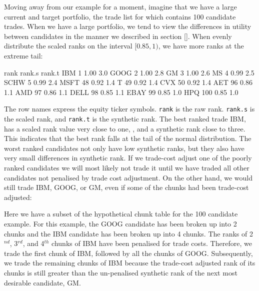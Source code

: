 \documentclass{article}
\begin{document}
Moving away from our example for a moment, imagine that we have a
large current and target portfolio, the trade list for which contains
100 candidate trades.  When we have a large portfolio, we tend to
view the differences in  utility between candidates in the
manner we described in section \ref{}.  When evenly distribute the
scaled ranks on the interval $[0.85,1)$, we have more ranks at
the extreme tail:

\begin{Schunk}
\begin{Soutput}
     rank rank.s rank.t
IBM     1   1.00    3.0
GOOG    2   1.00    2.8
GM      3   1.00    2.6
MS      4   0.99    2.5
SCHW    5   0.99    2.4
MSFT   48   0.92    1.4
T      49   0.92    1.4
CVX    50   0.92    1.4
AET    96   0.86    1.1
AMD    97   0.86    1.1
DELL   98   0.85    1.1
EBAY   99   0.85    1.0
HPQ   100   0.85    1.0
\end{Soutput}
\end{Schunk}

The row names express the equity ticker symbols.  \texttt{rank} is the
raw rank. \texttt{rank.s} is the scaled rank, and \texttt{rank.t} is
the synthetic rank.  The best ranked trade
IBM, has a scaled rank value very
close to one, , and
a synthetic rank close to three.  This indicates that the best rank
falls at the tail of the normal distribution.  The worst ranked
candidates not only have low synthetic ranks, but they also have very
small  differences in synthetic rank.  If we trade-cost adjust
one of the poorly ranked candidates we will most likely not trade it
until we have traded all other candidates not penalised by trade cost
adjustment.  On the other hand, we would still trade
IBM,
GOOG, or
GM, even if some of the chunks had
been trade-cost adjusted:

Here we have a subset of the hypothetical chunk table for the 100
candidate example.  For this example, the GOOG candidate has been
broken up into 2 chunks and the IBM candidate has been broken up into
4 chunks.  The ranks of 2$^{nd}$, 3$^{rd}$, and
4$^{th}$ chunks of IBM have been penalised for trade costs.
Therefore, we trade the first chunk of IBM, followed by all the chunks
of GOOG.  Subsequently, we trade the remaining chunks of IBM because
the trade-cost adjusted rank of its chunks is still greater than the
un-penalised synthetic rank of the next most desirable candidate, GM.
\end{document}
